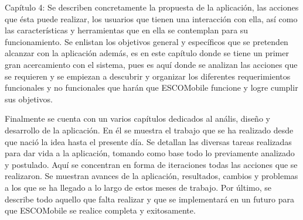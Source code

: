 \newpage 
\noindent
Capítulo 4: Se describen concretamente la propuesta de la aplicación, las acciones que ésta puede realizar, los usuarios que tienen una interacción con ella, así como las características y herramientas que en ella se contemplan para su funcionamiento. Se enlistan los objetivos general y específicos que se pretenden alcanzar con la aplicación además, es en este capítulo donde se tiene un primer gran acercamiento con el sistema, pues es aquí donde se analizan las acciones que se requieren y se empiezan a descubrir y organizar los diferentes requerimientos funcionales y no funcionales que harán que ESCOMobile funcione y logre cumplir sus objetivos. 
\newline

\noindent
Finalmente se cuenta con un varios capítulos dedicados al anális, diseño y desarrollo de la aplicación. En él se muestra el trabajo que se ha realizado desde que nació la idea hasta el presente día. Se detallan las diversas tareas realizadas para dar vida a la aplicación, tomando como base todo lo previamente analizado y postulado. Aquí se concentran en forma de iteraciones todas las acciones que se realizaron. Se muestran avances de la aplicación, resultados, cambios y problemas a los que se ha llegado a lo largo de estos meses de trabajo. Por último, se describe todo aquello que falta realizar y que se implementará en un futuro para que ESCOMobile se realice completa y exitosamente.
\newline

